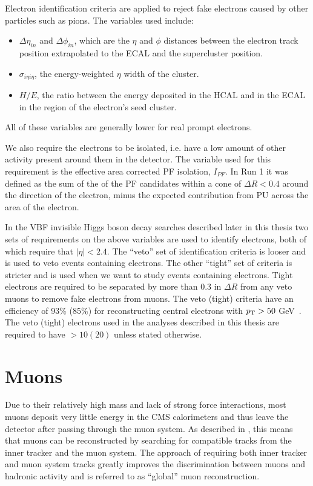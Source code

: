 Electron identification criteria are applied to reject fake electrons caused by other particles such as pions. The variables used include:
\begin{itemize}
\item $\Delta\eta_{in}$ and $\Delta\phi_{in}$, which are the $\eta$ and $\phi$ distances between the electron track position extrapolated to the \ac{ECAL} and the supercluster position.
\item $\sigma_{i\eta i\eta}$, the energy-weighted $\eta$ width of the cluster.
\item $H/E$, the ratio between the energy deposited in the \ac{HCAL} and in the \ac{ECAL} in the region of the electron's seed cluster.
\end{itemize}
All of these variables are generally lower for real prompt electrons.

We also require the electrons to be isolated, i.e. have a low amount of other activity present around them in the detector. The variable used for this requirement is the effective area corrected \ac{PF} isolation, $I_{PF}$. In Run 1 it was defined as the sum of the \pt of the \ac{PF} candidates within a cone of $\Delta R<0.4$ around the direction of the electron, minus the expected contribution from \ac{PU} across the area of the electron.

In the \ac{VBF} invisible Higgs boson decay searches described later in this thesis two sets of requirements on the above variables are used to identify electrons, both of which require that $|\eta|<2.4$. The ``veto'' set of identification criteria is looser and is used to veto events containing electrons. The other ``tight'' set of criteria is stricter and is used when we want to study events containing electrons. Tight electrons are required to be separated by more than 0.3 in $\Delta R$ from any veto muons to remove fake electrons from muons. The veto (tight) criteria have an efficiency of 93\% (85\%) for reconstructing central electrons with $p_{\mathrm{T}}>50$ GeV~\cite{eleeff}. The veto (tight) electrons used in the analyses described in this thesis are required to have \pt$>10 (20)$ \GeV unless stated otherwise.

\section{Muons}
\label{sec:muons}
Due to their relatively high mass and lack of strong force interactions, most muons deposit very little energy in the CMS calorimeters and thus leave the detector after passing through the muon system. As described in , this means that muons can be reconstructed by searching for compatible tracks from the inner tracker and the muon system. The approach of requiring both inner tracker and muon system tracks greatly improves the discrimination between muons and hadronic activity and is referred to as ``global'' muon reconstruction.

